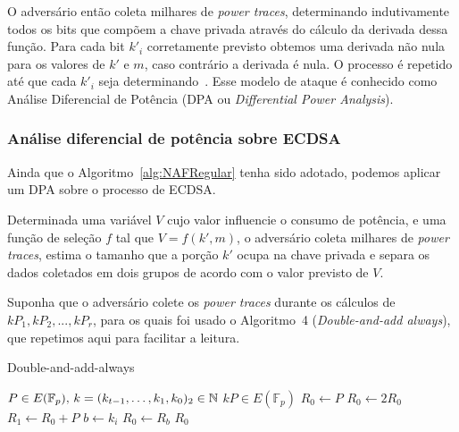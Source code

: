 \documentclass{SBCbookchapter}
\begin{document}
O advers\'{a}rio ent\~{a}o coleta milhares de \textit{power traces}, determinando indutivamente todos os bits que comp\~{o}em a chave privada atrav\'{e}s do c\'{a}lculo da derivada dessa fun\c{c}\~{a}o. Para cada bit $k'_{i}$ corretamente previsto obtemos uma derivada n\~{a}o nula para os valores de $k'$ e $m$, caso contr\'{a}rio a derivada \'{e} nula. O processo \'{e} repetido at\'{e} que cada $k'_{i}$ seja determinando~\cite{ECCBook_HankersonVanstone2004}. Esse modelo de ataque \'{e} conhecido como An\'{a}lise Diferencial de Pot\^{e}ncia (DPA ou \textit{Differential Power Analysis}).


\subsubsection{An\'{a}lise diferencial de pot\^{e}ncia sobre ECDSA}
Ainda que o Algoritmo~\ref{alg:NAFRegular} tenha sido adotado, podemos aplicar um DPA sobre o processo de ECDSA. 

Determinada uma vari\'{a}vel $V$ cujo valor influencie o consumo de pot\^{e}ncia, e uma fun\c{c}\~{a}o de sele\c{c}\~{a}o $f$ tal que $V = f(k', m)$, o advers\'{a}rio coleta milhares de \textit{power traces}, estima o tamanho que a por\c{c}\~{a}o $k'$ ocupa na chave privada e separa os dados coletados em dois grupos de acordo com o valor previsto de $V$.

Suponha que o adversário colete os \textit{power traces} durante os c\'{a}lculos de $kP_{1} , kP_{2} , ..., kP_{r}$, para os quais foi usado o Algoritmo~4  (\emph{Double-and-add always}), que repetimos aqui para facilitar a leitura.
\setcounter{foo}{\value{algorithm}}
\setcounter{algorithm}{3}
\begin{algorithm}[htb]
\caption{Double-and-add-always}
\begin{algorithmic}[1]
    \REQUIRE $P \in E(\mathbb{F}_p),\, k=(k_{t-1},\ldots,k_1,k_0)_{2} \in \mbox{${\mathbb N}$}$
    \ENSURE $kP \in E(\mathbb{F}_p)$
    \STATE $R_0 \leftarrow P$
        \STATE $R_0 \leftarrow 2R_0$
        \STATE $R_1 \leftarrow R_0 + P$
        \STATE $b \leftarrow k_{i}$
        \STATE $R_0 \leftarrow R_b$
    \ENDFOR
    \RETURN $R_0$
    \end{algorithmic}
\end{algorithm}
\setcounter{algorithm}{\value{foo}}
\end{document}

